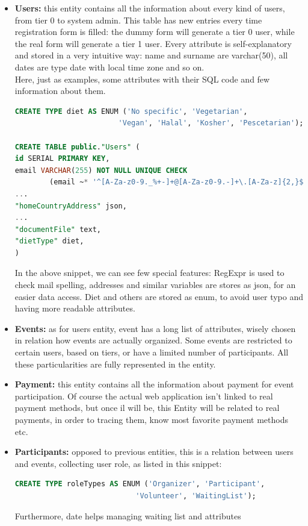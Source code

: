 \begin{itemize}
    \item \textbf{Users:} this entity contains all the information about every kind of users, from
    tier 0 to system admin. This table has new entries every time registration form is filled: the dummy
    form will generate a tier 0 user, while the real form will generate a tier 1 user. Every attribute 
    is self-explanatory and stored in a very intuitive way: name and surname are varchar(50), all dates
    are type date with local time zone and so on.\\
    Here, just as examples, some attributes with their SQL code and few information about them.
\begin{lstlisting}[language=SQL]
CREATE TYPE diet AS ENUM ('No specific', 'Vegetarian',
                        'Vegan', 'Halal', 'Kosher', 'Pescetarian');

CREATE TABLE public."Users" (
id SERIAL PRIMARY KEY,
email VARCHAR(255) NOT NULL UNIQUE CHECK 
        (email ~* '^[A-Za-z0-9._%+-]+@[A-Za-z0-9.-]+\.[A-Za-z]{2,}$'),
...
"homeCountryAddress" json,
...
"documentFile" text,
"dietType" diet,
)
\end{lstlisting}
    In the above snippet, we can see few special features: RegExpr is used to check mail spelling,
    addresses and similar variables are stores as json, for an easier data access. Diet and others
    are stored as enum, to avoid user typo and having more readable attributes. %
    \item \textbf{Events:} as for users entity, event has a long list of attributes, wisely chosen
    in relation how events are actually organized. Some events are restricted to certain users, based
    on tiers, or have a limited number of participants. All these particularities are fully represented
    in the entity.
    \item \textbf{Payment:} this entity contains all the information about payment for event participation.
    Of course the actual web application isn't linked to real payment methods, but once il will be, this Entity
    will be related to real payments, in order to tracing them, know most favorite payment methods etc.
    \item \textbf{Participants:} opposed to previous entities, this is a relation between users and events,
    collecting user role, as listed in this snippet:
\begin{lstlisting}[language=SQL]
CREATE TYPE roleTypes AS ENUM ('Organizer', 'Participant',
                            'Volunteer', 'WaitingList');
\end{lstlisting}
    Furthermore, date helps managing waiting list and attributes %
\end{itemize}
